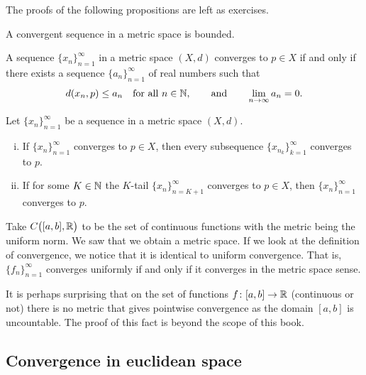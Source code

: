 The proofs of the following propositions are left as exercises.

\begin{prop} \label{prop:msconvbound}
A convergent sequence in a metric space is bounded.
\end{prop}

\begin{prop} \label{prop:msconvifa}
A sequence $\{ x_n \}_{n=1}^\infty$ in a metric space $(X,d)$ converges to $p \in X$
if and only
if there exists a sequence $\{ a_n \}_{n=1}^\infty$ of real numbers such that
\begin{equation*}
d(x_n,p) \leq a_n \quad \text{for all } n \in {\mathbb{N}},
\qquad
\text{and}
\qquad
\lim_{n\to\infty} a_n = 0.
\end{equation*}
\end{prop}

\begin{prop} \label{prop:mssubseq}
Let $\{ x_n \}_{n=1}^\infty$ be a sequence in a metric space $(X,d)$.
\begin{enumerate}[(i)]
\item If $\{ x_n \}_{n=1}^\infty$ converges to $p \in X$, then every
subsequence $\{ x_{n_k} \}_{k=1}^\infty$
converges to $p$.
\item If for some $K \in {\mathbb{N}}$ the $K$-tail $\{ x_n \}_{n=K+1}^\infty$
converges to $p \in X$, then
 $\{ x_n \}_{n=1}^\infty$ converges to $p$.
\end{enumerate}
\end{prop}

\begin{example}
Take $C\bigl([a,b],{\mathbb{R}}\bigr)$ to be the set of continuous functions with the metric being
the uniform norm.  We saw that we obtain a metric space.
If we look at the definition of convergence, we notice that it is identical
to uniform convergence.  That is, $\{ f_n \}_{n=1}^\infty$ converges uniformly if and only
if it converges in the metric space sense.
\end{example}

\begin{remark}
It is perhaps surprising that on the set of functions $f \colon [a,b] \to
{\mathbb{R}}$ (continuous or not)
there is no metric that gives pointwise convergence as the domain $[a,b]$
is uncountable.  The proof of
this fact is beyond the scope of this book.
\end{remark}

\subsection{Convergence in euclidean space}

